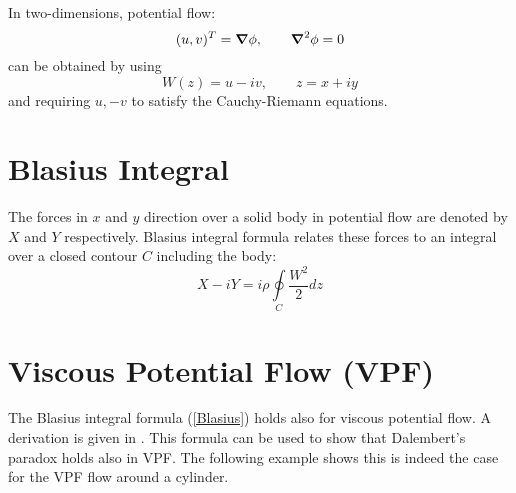 

In two-dimensions, potential flow:
\begin{equation*}
 (u,v)^T = \mbox{\boldmath{${\nabla}$}} \phi, \quad \quad \mbox{\boldmath{${\nabla}$}}^2 \phi = 0
\end{equation*}
can be obtained by using
\begin{equation}
 W(z) = u - i v, \quad \quad z=x+i y
\end{equation}
and requiring $u,-v$ to satisfy the Cauchy-Riemann equations. 

\section{Blasius Integral}

The forces in $x$ and $y$ direction over a solid body in potential flow are denoted by $X$ and $Y$ respectively. 
Blasius integral formula relates these forces to an integral over a closed contour $C$ including the body:
\begin{equation}
 X- i Y = i \rho \oint \limits_C \frac{W^2}{2} dz
\label{Blasius}
\end{equation}

\section{Viscous Potential Flow (VPF)}
The Blasius integral formula (\ref{Blasius}) holds also for viscous potential flow. 
A derivation is given in \cite{JosephVPF93}. 
This formula can be used to show that Dalembert's paradox holds also in VPF. 
The following example shows this is indeed the case for the VPF flow around a cylinder. 

